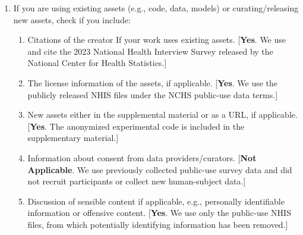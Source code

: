 \documentclass[twoside]{article}
\begin{document}
\begin{enumerate}
\begin{enumerate}
    \item All the training details (e.g., data splits, hyperparameters, how they were chosen).
    [\textbf{Yes}.]

    \item A clear definition of the specific measure or statistics and error bars (e.g., with respect to the random seed after running experiments multiple times).
    [\textbf{Yes}. Experimental protocols, metrics, numbers of replications,
    and variability across runs are described in the supplementary material.]

    \item A description of the computing infrastructure used. (e.g., type of GPUs, internal cluster, or cloud provider).
    [\textbf{Yes}. Experiments were run on an Ubuntu 24.04 VM with 4 vCPUs, 16 GB of RAM, and 30 GB of disk.]
  \end{enumerate}

  \item If you are using existing assets (e.g., code, data, models) or curating/releasing new assets, check if you include:
  \begin{enumerate}
    \item Citations of the creator If your work uses existing assets.
    [\textbf{Yes}. We use and cite the 2023 National Health Interview Survey
    released by the National Center for Health Statistics.]

    \item The license information of the assets, if applicable.
    [\textbf{Yes}. We use the publicly released NHIS files under the NCHS
    public-use data terms.]

    \item New assets either in the supplemental material or as a URL, if applicable.
    [\textbf{Yes}. The anonymized experimental code is included in the
    supplementary material.]

    \item Information about consent from data providers/curators.
    [\textbf{Not Applicable}. We use previously collected public-use survey
    data and did not recruit participants or collect new human-subject data.]

    \item Discussion of sensible content if applicable, e.g., personally identifiable information or offensive content.
    [\textbf{Yes}. We use only the public-use NHIS files, from which
    potentially identifying information has been removed.]
  \end{enumerate}


\end{enumerate}
\end{document}
